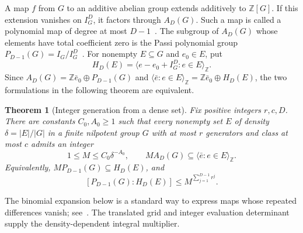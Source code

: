 \documentclass[11pt,a4paper,reqno]{amsart}
\newtheorem{theorem}{Theorem}[section]
\theoremstyle{definition}
\theoremstyle{remark}
\numberwithin{equation}{section}
\newcommand{\Z}{\mathbb Z}
\newcommand{\spanZ}[1]{\langle #1\rangle_{\Z}}
\begin{document}
A map $f$ from $G$ to an additive abelian group extends additively to $\Z[G]$. If this extension vanishes on $I_G^D$, it factors through $A_D(G)$. Such a map is called a polynomial map of degree at most $D-1$~\cite[Chapter V, \S1, Definition 1.1 and Example 1.3(ii)]{PassiBook}. The subgroup of $A_D(G)$ whose elements have total coefficient zero is the Passi polynomial group $P_{D-1}(G)=I_G/I_G^D$~\cite{Passi1968}. For nonempty $E\subseteq G$ and $e_0\in E$, put
\[
 H_D(E)=\spanZ{e-e_0+I_G^D:e\in E}.
\]
Since $A_D(G)=\Z\bar e_0\oplus P_{D-1}(G)$ and $\spanZ{\bar e:e\in E}=\Z\bar e_0\oplus H_D(E)$, the two formulations in the following theorem are equivalent.

\begin{theorem}[Integer generation from a dense set]\label{lem:density}
Fix positive integers $r,c,D$. There are constants $C_0,A_0\ge1$ such that every nonempty set $E$ of density $\delta=|E|/|G|$ in a finite nilpotent group $G$ with at most $r$ generators and class at most $c$ admits an integer
\begin{equation}\label{eq:multiplier}
 1\le M\le C_0\delta^{-A_0},\qquad
 MA_D(G)\subseteq\spanZ{\bar e:e\in E}.
\end{equation}
Equivalently, $MP_{D-1}(G)\subseteq H_D(E)$, and
\begin{equation}\label{eq:passi-index}
 [P_{D-1}(G):H_D(E)]\le M^{\sum_{j=1}^{D-1}r^j}.
\end{equation}
\end{theorem}
The binomial expansion below is a standard way to express maps whose repeated differences vanish; see~\cite[Theorem 2.7]{Schauz}. The translated grid and integer evaluation determinant supply the density-dependent integral multiplier.
\end{document}
